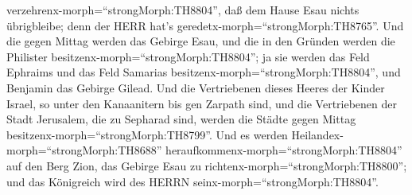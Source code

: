 verzehrenx-morph=``strongMorph:TH8804'', daß dem Hause Esau nichts
übrigbleibe; denn der HERR hat's geredetx-morph=``strongMorph:TH8765''.
 Und die gegen Mittag werden das Gebirge Esau, und die in
den Gründen werden die Philister besitzenx-morph=``strongMorph:TH8804'';
ja sie werden das Feld Ephraims und das Feld Samarias
besitzenx-morph=``strongMorph:TH8804'', und Benjamin das Gebirge Gilead.
 Und die Vertriebenen dieses Heeres der Kinder Israel, so
unter den Kanaanitern bis gen Zarpath sind, und die Vertriebenen der
Stadt Jerusalem, die zu Sepharad sind, werden die Städte gegen Mittag
besitzenx-morph=``strongMorph:TH8799''.  Und es werden
Heilandex-morph=``strongMorph:TH8688''
heraufkommenx-morph=``strongMorph:TH8804'' auf den Berg Zion, das
Gebirge Esau zu richtenx-morph=``strongMorph:TH8800''; und das
Königreich wird des HERRN seinx-morph=``strongMorph:TH8804''.
